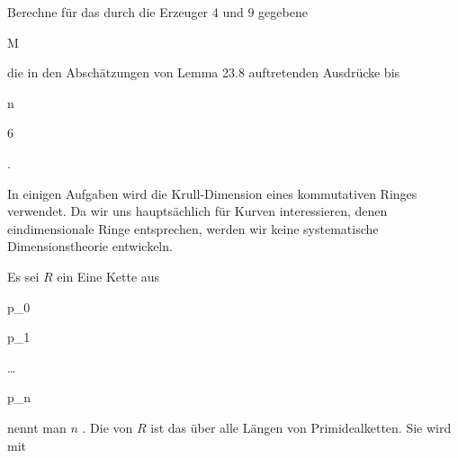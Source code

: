 {} {}



{}

{


Berechne für das durch die Erzeuger $4$ und $9$ gegebene


\mavergleichskette

{\vergleichskette

{ M
}

{ \subseteq }{ \N
}

{  }{
}

{    }{
}

{   }{
}

}
{}{}{}
die in den Abschätzungen von
Lemma 23.8
auftretenden Ausdrücke bis


\mavergleichskette

{\vergleichskette

{ n
}

{ \leq }{ 6
}

{  }{
}

{    }{
}

{   }{
}

}
{}{}{.}


}

{} {}


In einigen Aufgaben wird die Krull-Dimension eines kommutativen Ringes verwendet. Da wir uns hauptsächlich für Kurven interessieren, denen eindimensionale Ringe entsprechen, werden wir keine systematische Dimensionstheorie entwickeln.


Es sei $R$ ein
Eine Kette aus


\mavergleichskettedisp

{\vergleichskette

{ {\mathfrak p}_0
}

{ \subset} { {\mathfrak p}_1
}

{ \subset} { \ldots
}

{ \subset} { {\mathfrak p}_n
}

{ } {
}

}
{}{}{}
nennt man  $n$
 {} {.}
Die 
 {} {}
von $R$ ist das
über alle Längen von Primidealketten. Sie wird mit

